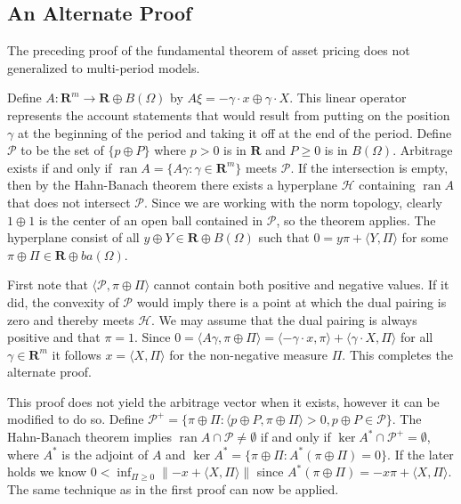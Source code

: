 \documentclass[fleqn]{amsart}
\newcommand{\R}{\mathbf{R}}
\newcommand{\HH}{\mathcal{H}}
\newcommand{\PP}{\mathcal{P}}
\newcommand{\ran}{\mathop{\mathrm{ran}}}
\renewcommand{\ker}{\mathop{\mathrm{ker}}}
\providecommand{\norm}[1]{\lVert#1\rVert}
\providecommand{\pair}[1]{\langle#1\rangle}
\begin{document}
\subsection{An Alternate Proof}
The preceding proof of the fundamental theorem of asset pricing
does not generalized to multi-period models.

Define $A\colon\R^m\to \R\oplus B(\Omega)$ by $A\xi = -\gamma\cdot x \oplus
\gamma\cdot X$.  This linear operator represents the account statements
that would result from putting on the position $\gamma$ at the beginning
of the period and taking it off at the end of the period.
Define $\PP$
to be the set of $\{p \oplus P\}$ where $p > 0$ is in $\R$ and $P \ge 0$
is in $B(\Omega)$.  Arbitrage exists if and only if $\ran A = \{A\gamma
: \gamma\in \R^m\}$ meets $\PP$.  If the intersection is empty, then by
the Hahn-Banach theorem \cite{BanMaz1933} there exists a hyperplane
$\HH$ containing $\ran A$ that does not intersect $\PP$. Since we are
working with the norm topology, clearly $1\oplus 1$ is the center of an
open ball contained in $\PP$, so the theorem applies.  The hyperplane
consist of all $y\oplus Y\in \R\oplus B(\Omega)$ such that $0 = y\pi +
\langle Y,\Pi\rangle$ for some $\pi\oplus\Pi\in\R\oplus ba(\Omega)$.

First note that $\langle \PP, \pi\oplus\Pi\rangle$ cannot contain
both positive and negative values. If it did, the convexity of $\PP$
would imply there is a point at which the dual pairing is zero and thereby 
meets $\HH$. 
We may assume that the dual pairing is always positive and that $\pi
= 1$.  Since $0 = \pair{A\gamma, \pi\oplus\Pi} = \pair{ -\gamma\cdot
x, \pi} + \pair{\gamma\cdot X, \Pi}$ for all $\gamma\in\R^m$
it follows $x = \langle X,\Pi\rangle$ for the non-negative measure
$\Pi$. This completes the alternate proof.

This proof does not yield the arbitrage vector when it exists, however
it can be modified to do so. Define $\PP^+ = \{\pi\oplus\Pi : \langle
p\oplus P,\pi\oplus\Pi\rangle > 0, p\oplus P\in\PP\}$. The Hahn-Banach
theorem implies $\ran A\cap\PP \not=\emptyset$ if and only if $\ker
A^*\cap\PP^+ = \emptyset$, where $A^*$ is the adjoint of $A$ and
$\ker A^* = \{\pi\oplus\Pi : A^*(\pi\oplus\Pi) = 0\}$. If the later
holds we know $0 < \inf_{\Pi\ge0} \norm{-x + \langle X,\Pi\rangle}$
since $A^*(\pi\oplus\Pi) = -x\pi + \langle X,\Pi\rangle$. The same
technique as in the first proof can now be applied.

\end{document}
